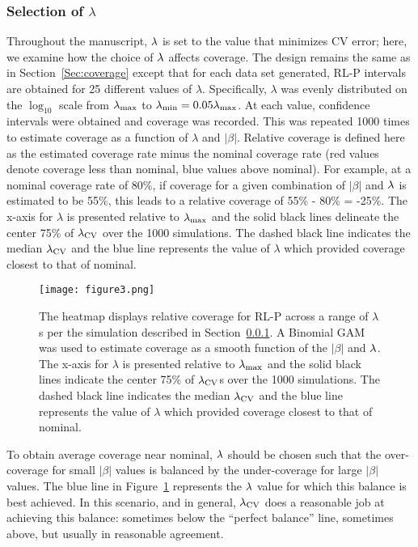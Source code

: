 \subsubsection{Selection of \texorpdfstring{$\lambda$}{lambda}} \label{Sec:lambda}

Throughout the manuscript, $\lambda$ is set to the value that minimizes CV error; here, we examine how the choice of $\lambda$ affects coverage. The design remains the same as in Section~\ref{Sec:coverage} except that for each data set generated, RL-P intervals are obtained for 25 different values of $\lambda$. Specifically, $\lambda$ was evenly distributed on the $\log_{10}$ scale from $\lambda_{\max}$ to $\lambda_{\min} = 0.05 \lambda_{\max}$. At each value, confidence intervals were obtained and coverage was recorded. This was repeated 1000 times to estimate coverage as a function of $\lambda$ and $|\beta|$. Relative coverage is defined here as the estimated coverage rate minus the nominal coverage rate (red values denote coverage less than nominal, blue values above nominal). For example, at a nominal coverage rate of 80\%, if coverage for a given combination of $|\beta|$ and $\lambda$ is estimated to be 55\%, this leads to a relative coverage of 55\% - 80\% = -25\%. The x-axis for $\lambda$ is presented relative to $\lambda_{\max}$ and the solid black lines delineate the center 75\% of $\lambda_{\textrm{CV}}$ over the 1000 simulations. The dashed black line indicates the median $\lambda_{\textrm{CV}}$ and the blue line represents the value of $\lambda$ which provided coverage closest to that of nominal.

\begin{figure}[htb!]
  \begin{center}
    \texttt{[image: figure3.png]}
    \caption{\label{fig:3} The heatmap displays relative coverage for RL-P across a range of $\lambda$s per the simulation described in Section~\ref{Sec:lambda}. A Binomial GAM was used to estimate coverage as a smooth function of the $|\beta|$ and $\lambda$. The x-axis for $\lambda$ is presented relative to $\lambda_{\max}$ and the solid black lines indicate the center 75\% of $\lambda_{\textrm{CV}}$s over the 1000 simulations. The dashed black line indicates the median $\lambda_{\textrm{CV}}$ and the blue line represents the value of $\lambda$ which provided coverage closest to that of nominal.}
  \end{center}
\end{figure}

To obtain average coverage near nominal, $\lambda$ should be chosen such that the over-coverage for small $|\beta|$ values is balanced by the under-coverage for large $|\beta|$ values. The blue line in Figure~\ref{fig:3} represents the $\lambda$ value for which this balance is best achieved. In this scenario, and in general, $\lambda_{\textrm{CV}}$ does a reasonable job at achieving this balance: sometimes below the ``perfect balance'' line, sometimes above, but usually in reasonable agreement.

